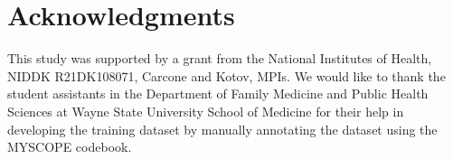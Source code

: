 \documentclass{amia}
\begin{document}
\section*{Acknowledgments}
This study was supported by a grant from the National Institutes of Health, NIDDK R21DK108071, Carcone and Kotov, MPIs. We would like to thank the student assistants in the Department of Family Medicine and Public Health Sciences at Wayne State University School of Medicine for their help in developing the training dataset by manually annotating the dataset using the MYSCOPE codebook. 



\end{document}
